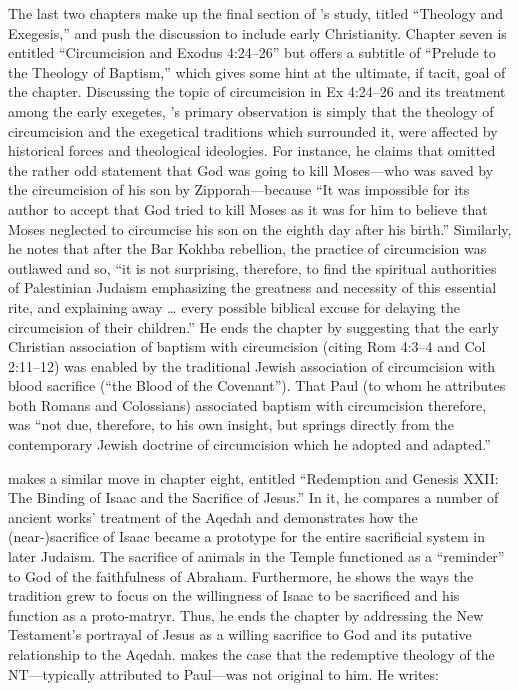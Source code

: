 The last two chapters make up the final section of \vermes's study, titled ``Theology and Exegesis,'' and push the discussion to include early Christianity. Chapter seven is entitled ``Circumcision and Exodus 4:24--26'' but offers a subtitle of ``Prelude to the Theology of Baptism,'' which gives some hint at the ultimate, if tacit, goal of the chapter. Discussing the topic of circumcision in Ex 4:24--26 and its treatment among the early exegetes, \vermes's primary observation is simply that the theology of circumcision and the exegetical traditions which surrounded it, were affected by historical forces and theological ideologies. For instance, he claims that \jub omitted the rather odd statement that God was going to kill Moses---who was saved by the circumcision of his son by Zipporah---because ``It was impossible for its author to accept that God tried to kill Moses as it was for him to believe that Moses neglected to circumcise his son on the eighth day after his birth.''\autocite[185]{vermes1961} Similarly, he notes that after the Bar Kokhba rebellion, the practice of circumcision was outlawed and so, ``it is not surprising, therefore, to find the spiritual authorities of Palestinian Judaism emphasizing the greatness and necessity of this essential rite, and explaining away \ldots{} every possible biblical excuse for delaying the circumcision of their children.''\autocite[189]{vermes1961} He ends the chapter by suggesting that the early Christian association of baptism with circumcision (citing Rom 4:3--4 and Col 2:11--12) was enabled by the traditional Jewish association of circumcision with blood sacrifice (``the Blood of the Covenant'')\autocite[190]{vermes1961}. That Paul (to whom he attributes both Romans and Colossians) associated baptism with circumcision therefore, was ``not due, therefore, to his own insight, but springs directly from the contemporary Jewish doctrine of circumcision which he adopted and adapted.''\autocite[191]{vermes1961} 

 \vermes makes a similar move in chapter eight, entitled ``Redemption and Genesis XXII: The Binding of Isaac and the Sacrifice of Jesus.'' In it, he compares a number of ancient works' treatment of the Aqedah and demonstrates how the (near-)sacrifice of Isaac became a prototype for the entire sacrificial system in later Judaism. The sacrifice of animals in the Temple functioned as a ``reminder'' to God of the faithfulness of Abraham. Furthermore, he shows the ways the tradition grew to focus on the willingness of Isaac to be sacrificed and his function as a proto-matryr. Thus, he ends the chapter by addressing the New Testament's portrayal of Jesus as a willing sacrifice to God and its putative relationship to the Aqedah. \vermes makes the case that the redemptive theology of the NT---typically attributed to Paul---was not original to him. He writes: 

